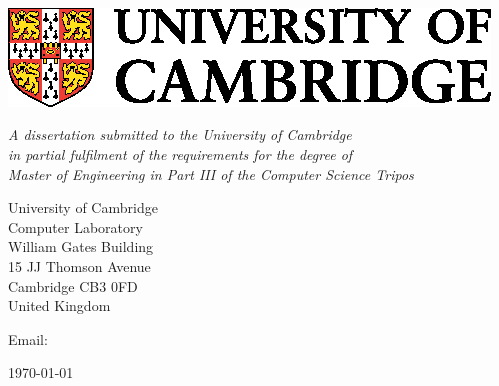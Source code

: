 \begin{titlepage} 

\begin{center}
\noindent
\huge
\dissertationtitle \\
\end{center}

\begin{center}
\noindent
\huge
\authorname \\
\Large
\authorcollege      \\[24pt]
\includegraphics{CUni3.eps}
\end{center}

\vspace{24pt} 

\begin{center}
\noindent
\large
{\it A dissertation submitted to the University of Cambridge \\ 
in partial fulfilment of the requirements for the degree of \\ 
Master of Engineering in Part III of the Computer Science Tripos}
\end{center}

\begin{center}
\noindent
University of Cambridge \\
Computer Laboratory     \\
William Gates Building  \\
15 JJ Thomson Avenue    \\
Cambridge CB3 0FD       \\
{\sc United Kingdom}    \\
\end{center}

\begin{center}
\noindent
Email: \authoremail \\
\end{center}

\begin{center}
\noindent
\today
\end{center}

\end{titlepage} 

\newpage
\vspace*{\fill}
